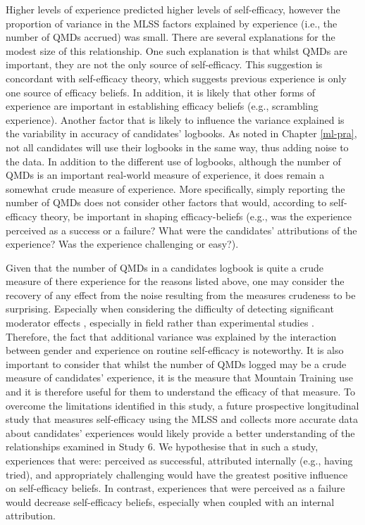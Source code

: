 \documentclass[
  12pt,
  a4paper,
]{book}
\begin{document}
Higher levels of experience predicted higher levels of self-efficacy, however the proportion of variance in the MLSS factors explained by experience (i.e., the number of QMDs accrued) was small. There are several explanations for the modest size of this relationship. One such explanation is that whilst QMDs are important, they are not the only source of self-efficacy. This suggestion is concordant with self-efficacy theory, which suggests previous experience is only one source of efficacy beliefs. In addition, it is likely that other forms of experience are important in establishing efficacy beliefs (e.g., scrambling experience). Another factor that is likely to influence the variance explained is the variability in accuracy of candidates' logbooks. As noted in Chapter \ref{ml-pra}, not all candidates will use their logbooks in the same way, thus adding noise to the data. In addition to the different use of logbooks, although the number of QMDs is an important real-world measure of experience, it does remain a somewhat crude measure of experience. More specifically, simply reporting the number of QMDs does not consider other factors that would, according to self-efficacy theory, be important in shaping efficacy-beliefs (e.g., was the experience perceived as a success or a failure? What were the candidates' attributions of the experience? Was the experience challenging or easy?).

Given that the number of QMDs in a candidates logbook is quite a crude measure of there experience for the reasons listed above, one may consider the recovery of any effect from the noise resulting from the measures crudeness to be surprising. Especially when considering the difficulty of detecting significant moderator effects \citep{Evans1985}, especially in field rather than experimental studies \citep{McClelland1993}. Therefore, the fact that additional variance was explained by the interaction between gender and experience on routine self-efficacy is noteworthy. It is also important to consider that whilst the number of QMDs logged may be a crude measure of candidates' experience, it is the measure that Mountain Training use and it is therefore useful for them to understand the efficacy of that measure. To overcome the limitations identified in this study, a future prospective longitudinal study that measures self-efficacy using the MLSS and collects more accurate data about candidates' experiences would likely provide a better understanding of the relationships examined in Study 6. We hypothesise that in such a study, experiences that were: perceived as successful, attributed internally (e.g., having tried), and appropriately challenging would have the greatest positive influence on self-efficacy beliefs. In contrast, experiences that were perceived as a failure would decrease self-efficacy beliefs, especially when coupled with an internal attribution.
\end{document}
